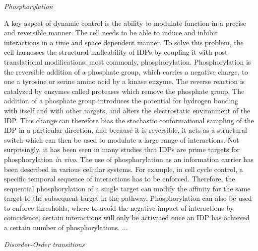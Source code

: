 {\it Phosphorylation}

A key aspect of dynamic control is the ability to modulate function in a precise and reversible manner.  The cell needs to be able to induce and inhibit interactions in a time and space dependent manner. To solve this problem, the cell harnesses the structural malleability of IDPs by coupling it with post translational modifications, most commonly, phosphorylation. Phosphorylation is the reversible addition of a phosphate group, which carries a negative charge, to one a tyrosine or serine amino acid by a kinase enzyme. The reverse reaction is catalyzed by enzymes called proteases which remove the phosphate group. The addition of a phosphate group introduces the potential for hydrogen bonding with itself and with other targets, and alters the electrostatic environment of the IDP. This change can therefore bias the stochastic conformational sampling of the IDP in a particular direction, and because it is reversible, it acts as a structural switch which can then be used to modulate a large range of interactions. Not surprisingly, it has been seen in many studies that IDPs are prime targets for phosphorylation {\it in vivo}.  The use of phosphorylation as an information carrier has been described in various cellular systems. For example, in cell cycle control, a specific temporal sequence of interactions has to be enforced. Therefore, the sequential phosphorylation of a single target can modify the affinity for the same target to the subsequent target in the pathway. Phosphorylation can also be used to enforce thresholds, where to avoid the negative impact of interactions by coincidence, certain interactions will only be activated once an IDP has achieved a certain number of phosphorylations.   ... \\ 

{\it Disorder-Order transitions}

